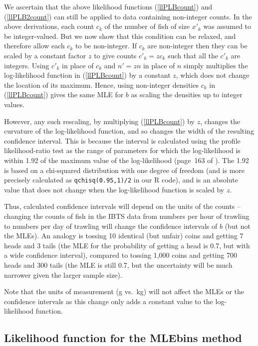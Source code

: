 \documentclass[12pt, letter]{article}
\begin{document}
We ascertain that the above likelihood functions (\ref{llPLBcount}) and
(\ref{llPLB2count}) can still be applied to data containing non-integer
counts. In the above derivations, each count $c_k$ of the number of fish of size
$x'_k$ was assumed to be integer-valued. But we now show that this condition can
be relaxed, and therefore allow each $c_k$ to be non-integer.
If $c_k$ are non-integer then they can be scaled by a constant factor $z$ to
give counts $c'_k=z c_k$ such that all the $c'_k$ are integers. Using $c'_k$ in
place of $c_k$ and $n'=z n$ in place of $n$ simply multiplies the log-likelihood
function in (\ref{llPLBcount}) by a constant $z$, which does not change the
location of
its maximum. Hence, using non-integer densities $c_k$ in (\ref{llPLBcount})
gives the same MLE for $b$ as scaling the densities up to integer values.

However, any such rescaling, by multiplying (\ref{llPLBcount}) by $z$,
changes the curvature of the log-likelihood function, and so changes the
width of the resulting confidence interval. This is because the interval
is calculated using the profile likelihood-ratio test as the
range of parameters for which the log-likelihood is within 1.92 of the maximum
value of the log-likelihood (page~163 of \citealt{hm97}). The 1.92 is based on
a chi-squared distribution with one degree of freedom (and is more precisely
calculated as {\tt qchisq(0.95,1)/2} in our R code), and is an absolute value
that does not change when the log-likelihood function is scaled by $z$.

Thus, calculated confidence intervals will depend on the units of the counts --
changing the counts of fish in the IBTS data from numbers per hour of trawling
to numbers per day of trawling will change the confidence intervals of $b$ (but
not the MLEs). An analogy is tossing 10 identical (but unfair)
coins and getting 7 heads and 3 tails
(the MLE for the probability of getting a head is 0.7, but with a wide
confidence interval), compared to tossing 1,000 coins and getting 700 heads and
300 tails (the MLE is still 0.7, but the uncertainty will be much narrower given
the larger sample size).

Note that the units of measurement (g vs.~kg) will not affect
the MLEs or the confidence intervals as this change only adds a constant value
to the log-likelihood function.

\subsection{Likelihood function for the MLEbins method\label{sec:MLEbinslike}}
\end{document}
